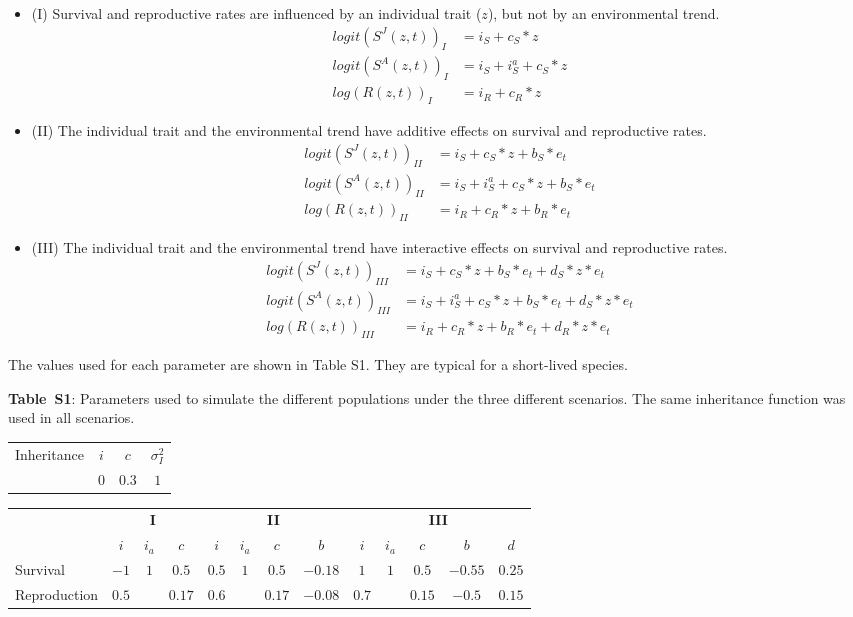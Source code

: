 \documentclass[12pt]{article}
\begin{document}
\begin{itemize}
\item (I) Survival and reproductive rates are influenced by an individual trait ($z$), but not by an environmental trend.
			\begin{align}
			logit(S^J(z,t))_I&=i_{S}  + c_{S}*z\\ \nonumber
			logit(S^A(z,t))_I&=i_{S} +i^a_{S} + c_{S}*z\\ \nonumber
			log(R(z,t))_I&=i_{R} + c_{R}*z \nonumber
			\end{align}
			
\item (II) The individual trait and the environmental trend have additive effects on survival and reproductive rates.
			\begin{align}
			logit(S^J(z,t))_{II}&=i_{S} + c_{S}*z+ b_{S}*e_t\\ \nonumber
			logit(S^A(z,t))_{II}&=i_{S} +i^a_{S} + c_{S}*z+ b_{S}*e_t\\ \nonumber
			log(R(z,t))_{II}&=i_{R} + c_{R}*z + b_{R}*e_t\nonumber
			\end{align}
			
\item (III) The individual trait and the environmental trend have interactive effects on survival and reproductive rates.
			\begin{align}
			logit(S^J(z,t))_{III}&=i_{S}  + c_{S}*z+ b_{S}*e_t+ d_{S}*z*e_t\\ \nonumber
			logit(S^A(z,t))_{III}&=i_{S} +i^a_{S} + c_{S}*z+ b_{S}*e_t+ d_{S}*z*e_t\\ \nonumber
			log(R(z,t))_{III}&=i_{R} + c_{R}*z + b_{R}*e_t+ d_{R}*z*e_t \nonumber
			\end{align}
\end{itemize}
			
The values used for each parameter are shown in Table S1. They are typical for a short-lived species.

\noindent \textbf{Table~S1}: Parameters used to simulate the different populations under the three different scenarios. The same inheritance function was used in all scenarios.
\nolinenumbers
\begin{center}
\begin{scriptsize}
\begin{tabular}{lccc}
\hline
Inheritance&$i$&$c$&$\sigma_I^2$\\
&$0$&$0.3$&$1$\\
\hline
\end{tabular}
\begin{tabular}{lccc|cccc|ccccc}
\hline
&\multicolumn{3}{c}{\normalsize\textbf{I}}&\multicolumn{4}{c}{\normalsize\textbf{II}}&\multicolumn{5}{c}{\normalsize\textbf{III}}\\
&$i$&$i_a$&$c$&$i$&$i_a$&$c$&$b$&$i$&$i_a$&$c$&$b$&$d$\\
Survival&$-1$&$1$&$0.5$&$0.5$&$1$&$0.5$&$-0.18$&$1$&$1$&$0.5$&$-0.55$&$0.25$\\
Reproduction&$0.5$&&$0.17$&$0.6$&&$0.17$&$-0.08$&$0.7$&&$0.15$&$-0.5$&$0.15$\\
\hline
\end{tabular}
\end{scriptsize}
\end{center}
\end{document}
